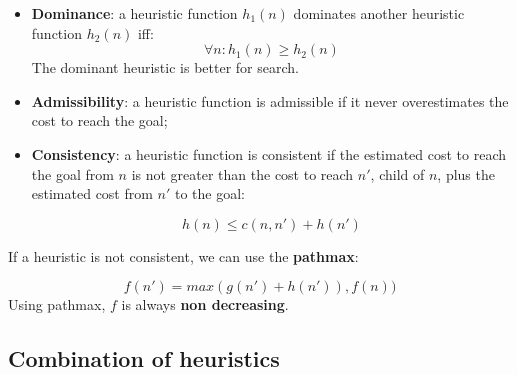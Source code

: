 \documentclass{article}
\begin{document}
\begin{itemize}
    \item \textbf{Dominance}: a heuristic function $h_1(n)$ dominates another heuristic function $h_2(n)$ iff:
    \begin{equation}
        \forall n : h_1(n) \geq h_2(n)
    \end{equation}
    The dominant heuristic is better for search.

    \item \textbf{Admissibility}: a heuristic function is admissible if it never overestimates the cost to reach the goal;

    \item \textbf{Consistency}: a heuristic function is consistent if the estimated cost to reach the goal from $n$ is not greater than the cost to reach $n'$, child of $n$, plus the estimated cost from $n'$ to the goal:

    \begin{equation}
        h(n) \leq c(n,n') + h(n')
    \end{equation}

\begin{center}
\end{center}    
\end{itemize}

\begin{flushleft}
    If a heuristic is not consistent, we can use the \textbf{pathmax}:
\end{flushleft}
\begin{equation}
    f(n') = max(g(n') + h(n')), f(n))
\end{equation}
Using pathmax, $f$ is always \textbf{non decreasing}.


\subsection{Combination of heuristics}
\end{document}
